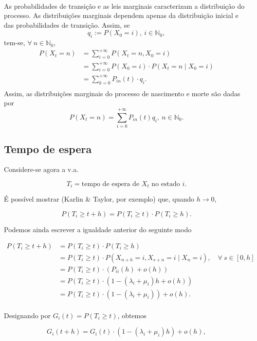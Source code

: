 \documentclass[
  11pt,
  a4paper,
]{book}
\theoremstyle{definition}
\theoremstyle{definition}
\theoremstyle{definition}
\theoremstyle{definition}
\theoremstyle{remark}
\begin{document}
\(\,\)

As probabilidades de transição e as leis marginais caracterizam a distribuição do processo. As distribuições marginais dependem apenas da distribuição inicial e das probabilidades de transição. Assim, se
\[q_i:=P(X_0=i), ~i \in \mathbb{N}_0,\]
tem-se, \(\forall ~n \in \mathbb{N}_0\),
\begin{align*}
P(X_t=n) &= \sum\limits_{i=0}^{+\infty} P(X_{t}=n, X_{0}=i) \\
         &= \sum\limits_{i=0}^{+\infty} P(X_{0}=i) \cdot P(X_{t}=n \mid X_{0}=i) \\
         &= \sum\limits_{k=0}^{+\infty} P_{in}(t) \cdot q_i. \\
\end{align*}
Assim, as distribuições marginais do processo de nascimento e morte são dadas por
\[\boxed{P(X_t=n)=\sum\limits_{i=0}^{+\infty} P_{in}(t) q_i, ~n \in \mathbb{N}_0.}\]

\subsection{Tempo de espera}\label{tempo-de-espera}

Considere-se agora a v.a.

\[T_i=\text{tempo de espera de } X_t \text{ no estado } i.\]

É possível mostrar (Karlin \& Taylor, por exemplo) que, quando \(h \to 0\),

\[P(T_i \geq t+h)=P(T_i \geq t) \cdot P(T_i \geq h).\]

Podemos ainda escrever a igualdade anterior do seguinte modo

\begin{align*}
P(T_i \geq t+h) &= P(T_i \geq t) \cdot P(T_i \geq h) \\
                &= P(T_i \geq t) \cdot P(X_{n+h}=i, X_{s+n}=i \mid X_n=i), \quad \forall ~s \in [0,h] \\
                &= P(T_i \geq t) \cdot (P_{ii}(h) + o(h))\\
                &= P(T_i \geq t) \cdot (1-(\lambda_i+\mu_i)h + o(h))\\
                &= P(T_i \geq t) \cdot (1-(\lambda_i+\mu_i))+ o(h).\\
\end{align*}

Designando por \(G_i(t)=P(T_i \geq t)\), obtemos

\[G_i(t+h)=G_i(t) \cdot (1-(\lambda_i+\mu_i)h) + o(h),\]
\end{document}
